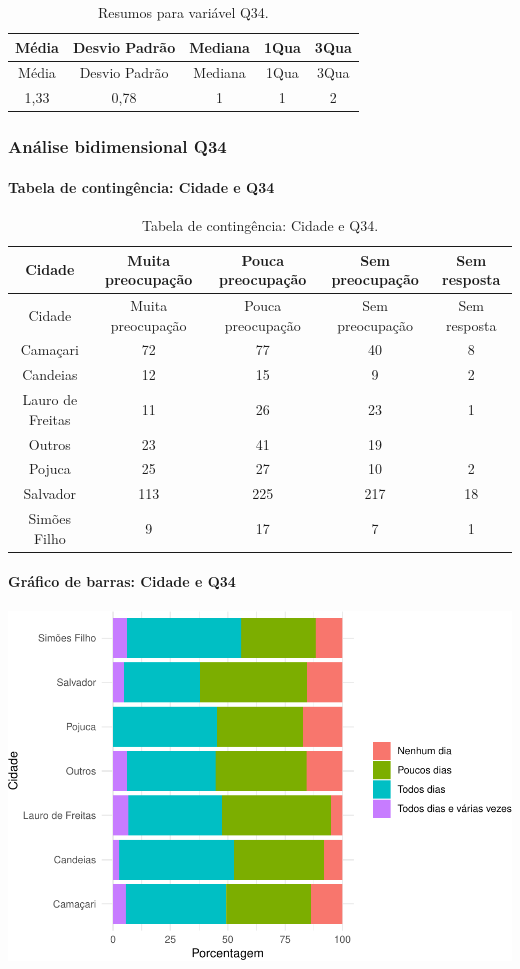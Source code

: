 \documentclass[]{article}
\let\oldparagraph\paragraph
\renewcommand{\paragraph}[1]{\oldparagraph{#1}\mbox{}}
\begin{document}
\begin{longtable}[]{@{}ccccc@{}}
\caption{\label{tab:unnamed-chunk-1191}Resumos para variável Q34.}\tabularnewline
\toprule
Média & Desvio Padrão & Mediana & 1Qua & 3Qua\tabularnewline
\midrule
\endfirsthead
\toprule
Média & Desvio Padrão & Mediana & 1Qua & 3Qua\tabularnewline
\midrule
\endhead
1,33 & 0,78 & 1 & 1 & 2\tabularnewline
\bottomrule
\end{longtable}

\cleardoublepage

\hypertarget{anuxe1lise-bidimensional-q34}{%
\subsubsection{Análise bidimensional Q34}\label{anuxe1lise-bidimensional-q34}}

\hypertarget{tabela-de-continguxeancia-cidade-e-q34}{%
\paragraph{Tabela de contingência: Cidade e Q34}\label{tabela-de-continguxeancia-cidade-e-q34}}

\begin{longtable}[]{@{}ccccc@{}}
\caption{\label{tab:unnamed-chunk-1192}Tabela de contingência: Cidade e Q34.}\tabularnewline
\toprule
Cidade & Muita preocupação & Pouca preocupação & Sem preocupação & Sem resposta\tabularnewline
\midrule
\endfirsthead
\toprule
Cidade & Muita preocupação & Pouca preocupação & Sem preocupação & Sem resposta\tabularnewline
\midrule
\endhead
Camaçari & 72 & 77 & 40 & 8\tabularnewline
Candeias & 12 & 15 & 9 & 2\tabularnewline
Lauro de Freitas & 11 & 26 & 23 & 1\tabularnewline
Outros & 23 & 41 & 19 &\tabularnewline
Pojuca & 25 & 27 & 10 & 2\tabularnewline
Salvador & 113 & 225 & 217 & 18\tabularnewline
Simões Filho & 9 & 17 & 7 & 1\tabularnewline
\bottomrule
\end{longtable}

\hypertarget{gruxe1fico-de-barras-cidade-e-q34}{%
\paragraph{Gráfico de barras: Cidade e Q34}\label{gruxe1fico-de-barras-cidade-e-q34}}

\begin{center}\includegraphics[width=0.75\linewidth]{relatorio_covid19_files/figure-latex/unnamed-chunk-1193-1} \end{center}
\end{document}
